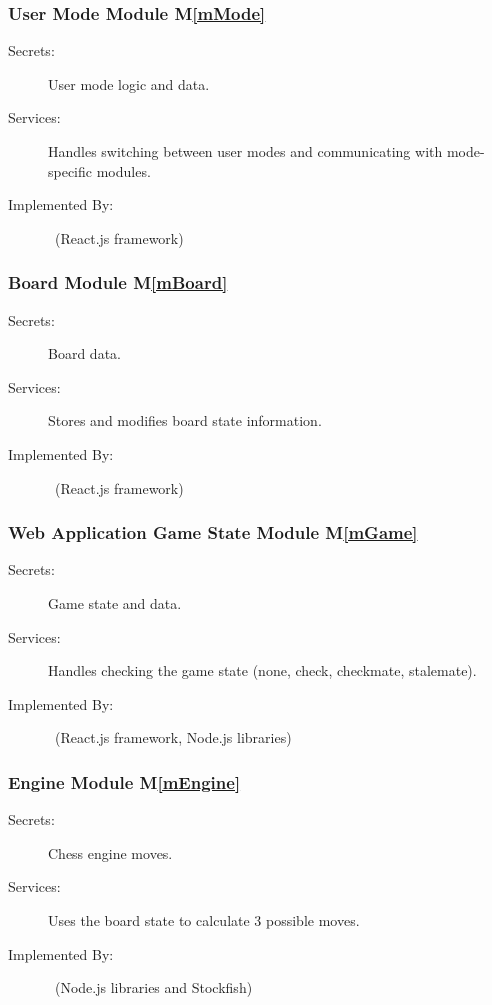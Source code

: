 \documentclass[12pt, titlepage]{article}
\newcommand{\mref}[1]{M\ref{#1}}
\begin{document}
    \subsubsection{User Mode Module \mref{mMode}}
    \begin{description}
    \item[Secrets:] User mode logic and data.
    \item[Services:] Handles switching between user modes and communicating with mode-specific modules.
    \item[Implemented By:] \progname\ (React.js framework)
    \end{description}

    \subsubsection{Board Module \mref{mBoard}}
    \begin{description}
    \item[Secrets:] Board data.
    \item[Services:] Stores and modifies board state information.
    \item[Implemented By:] \progname\ (React.js framework)
    \end{description}

    \subsubsection{Web Application Game State Module \mref{mGame}}
    \begin{description}
    \item[Secrets:] Game state and data.
    \item[Services:] Handles checking the game state (none, check, checkmate, stalemate).
    \item[Implemented By:] \progname\ (React.js framework, Node.js libraries)
    \end{description}
    
    \subsubsection{Engine Module \mref{mEngine}}
    \begin{description}
    \item[Secrets:] Chess engine moves.
    \item[Services:] Uses the board state to calculate 3 possible moves.
    \item[Implemented By:] \progname\ (Node.js libraries and Stockfish)
    \end{description}
\end{document}
